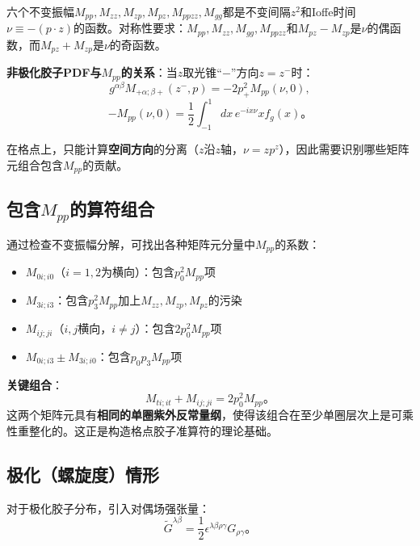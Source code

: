 \documentclass[12pt,a4paper]{ctexart}
\theoremstyle{definition}
\begin{document}
六个不变振幅$M_{pp}, M_{zz}, M_{zp}, M_{pz}, M_{ppzz}, M_{gg}$都是不变间隔$z^2$和Ioffe时间$\nu \equiv -(p \cdot z)$的函数。对称性要求：$M_{pp}, M_{zz}, M_{gg}, M_{ppzz}$和$M_{pz}-M_{zp}$是$\nu$的偶函数，而$M_{pz}+M_{zp}$是$\nu$的奇函数\cite{Balitsky2020}。

\textbf{非极化胶子PDF与$M_{pp}$的关系}：当$z$取光锥``$-$''方向$z=z^-$时\cite{Balitsky2020}：
\begin{equation}
g^{\alpha\beta} M_{+\alpha;\beta+}(z^-, p) = -2p^2_+ M_{pp}(\nu, 0),
\end{equation}
\begin{equation}
-M_{pp}(\nu, 0) = \frac{1}{2} \int_{-1}^{1} dx\, e^{-ix\nu} x f_g(x)。
\end{equation}

在格点上，只能计算\textbf{空间方向}的分离（$z$沿$z$轴，$\nu=zp^z$），因此需要识别哪些矩阵元组合包含$M_{pp}$的贡献。

\subsection{包含$M_{pp}$的算符组合}

通过检查不变振幅分解，可找出各种矩阵元分量中$M_{pp}$的系数\cite{Balitsky2020}：
\begin{itemize}
    \item $M_{0i;i0}$（$i=1,2$为横向）：包含$p^2_0 M_{pp}$项
    \item $M_{3i;i3}$：包含$p^2_3 M_{pp}$加上$M_{zz}, M_{zp}, M_{pz}$的污染
    \item $M_{ij;ji}$（$i,j$横向，$i\neq j$）：包含$2p^2_0 M_{pp}$项
    \item $M_{0i;i3} \pm M_{3i;i0}$：包含$p_0 p_3 M_{pp}$项
\end{itemize}

\textbf{关键组合}\cite{Balitsky2020,Chen2025gluon}：
\begin{equation}
\boxed{M_{ti;it} + M_{ij;ji} = 2p^2_0 M_{pp}}。
\end{equation}
这两个矩阵元具有\textbf{相同的单圈紫外反常量纲}，使得该组合在至少单圈层次上是可乘性重整化的。这正是构造格点胶子准算符的理论基础。

\subsection{极化（螺旋度）情形}

对于极化胶子分布，引入对偶场强张量\cite{Balitsky2020,Egerer2022}：
\begin{equation}
\tilde{G}^{\lambda\beta} = \frac{1}{2}\epsilon^{\lambda\beta\rho\gamma} G_{\rho\gamma}。
\end{equation}
\end{document}
